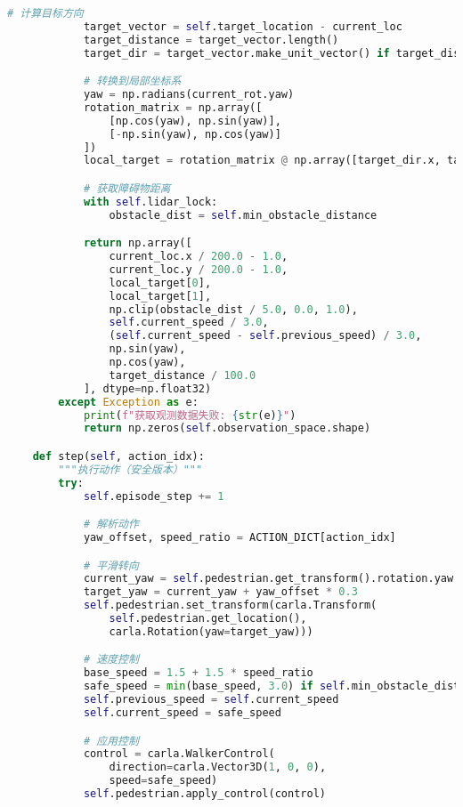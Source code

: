\begin{lstlisting}[language=Python]
            # 计算目标方向
            target_vector = self.target_location - current_loc
            target_distance = target_vector.length()
            target_dir = target_vector.make_unit_vector() if target_distance > 0 else carla.Vector3D()

            # 转换到局部坐标系
            yaw = np.radians(current_rot.yaw)
            rotation_matrix = np.array([
                [np.cos(yaw), np.sin(yaw)],
                [-np.sin(yaw), np.cos(yaw)]
            ])
            local_target = rotation_matrix @ np.array([target_dir.x, target_dir.y])

            # 获取障碍物距离
            with self.lidar_lock:
                obstacle_dist = self.min_obstacle_distance

            return np.array([
                current_loc.x / 200.0 - 1.0,
                current_loc.y / 200.0 - 1.0,
                local_target[0],
                local_target[1],
                np.clip(obstacle_dist / 5.0, 0.0, 1.0),
                self.current_speed / 3.0,
                (self.current_speed - self.previous_speed) / 3.0,
                np.sin(yaw),
                np.cos(yaw),
                target_distance / 100.0
            ], dtype=np.float32)
        except Exception as e:
            print(f"获取观测数据失败: {str(e)}")
            return np.zeros(self.observation_space.shape)

    def step(self, action_idx):
        """执行动作（安全版本）"""
        try:
            self.episode_step += 1

            # 解析动作
            yaw_offset, speed_ratio = ACTION_DICT[action_idx]

            # 平滑转向
            current_yaw = self.pedestrian.get_transform().rotation.yaw
            target_yaw = current_yaw + yaw_offset * 0.3
            self.pedestrian.set_transform(carla.Transform(
                self.pedestrian.get_location(),
                carla.Rotation(yaw=target_yaw)))

            # 速度控制
            base_speed = 1.5 + 1.5 * speed_ratio
            safe_speed = min(base_speed, 3.0) if self.min_obstacle_distance > 2.0 else 0.8
            self.previous_speed = self.current_speed
            self.current_speed = safe_speed

            # 应用控制
            control = carla.WalkerControl(
                direction=carla.Vector3D(1, 0, 0),
                speed=safe_speed)
            self.pedestrian.apply_control(control)


\end{lstlisting}
